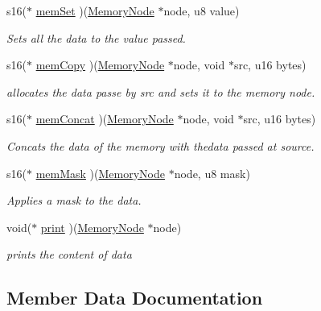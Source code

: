 \begin{DoxyCompactItemize}
s16($\ast$ \hyperlink{structmemory__node__ops__s_a25eeed1bed000ce61e20eb1889710be1}{mem\+Set} )(\hyperlink{structmemory__node__s}{Memory\+Node} $\ast$node, u8 value)
\begin{DoxyCompactList}\small\item\em Sets all the data to the value passed. \end{DoxyCompactList}\item 
s16($\ast$ \hyperlink{structmemory__node__ops__s_a6e6960186601b2a4dcfec2a33438b15b}{mem\+Copy} )(\hyperlink{structmemory__node__s}{Memory\+Node} $\ast$node, void $\ast$src, u16 bytes)
\begin{DoxyCompactList}\small\item\em allocates the data passe by src and sets it to the memory node. \end{DoxyCompactList}\item 
s16($\ast$ \hyperlink{structmemory__node__ops__s_a6cadae4d06b8349242302acc28c2df52}{mem\+Concat} )(\hyperlink{structmemory__node__s}{Memory\+Node} $\ast$node, void $\ast$src, u16 bytes)
\begin{DoxyCompactList}\small\item\em Concats the data of the memory with thedata passed at source. \end{DoxyCompactList}\item 
s16($\ast$ \hyperlink{structmemory__node__ops__s_a4499ba5d3e916cca07fe69339acb9703}{mem\+Mask} )(\hyperlink{structmemory__node__s}{Memory\+Node} $\ast$node, u8 mask)
\begin{DoxyCompactList}\small\item\em Applies a mask to the data. \end{DoxyCompactList}\item 
void($\ast$ \hyperlink{structmemory__node__ops__s_ad5a051d70388c508b600399b0cca0973}{print} )(\hyperlink{structmemory__node__s}{Memory\+Node} $\ast$node)
\begin{DoxyCompactList}\small\item\em prints the content of data \end{DoxyCompactList}\end{DoxyCompactItemize}


\subsection{Member Data Documentation}
\mbox{\label{structmemory__node__ops__s_a35f5ace76d5fd899597761eef516ba0a}} 
